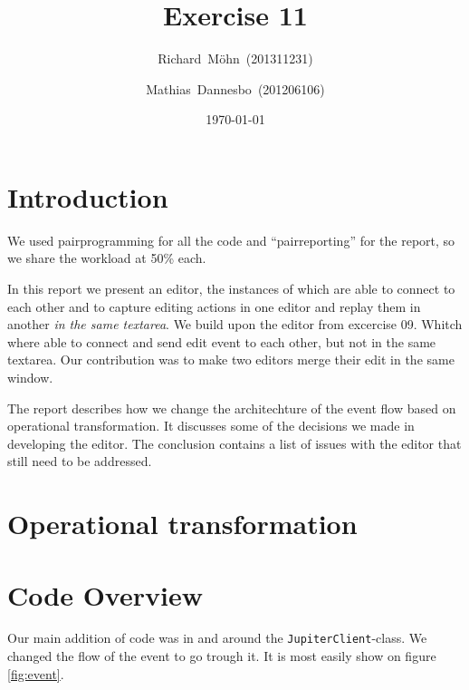 \documentclass[a4paper,draft,12pt,oneside,article,table]{memoir}
\newcommand{\supertitle}[1]{\gdef\suP{#1}}
\newcommand{\subtitle}[1]{\gdef\suB{#1}}
\newcommand{\stunum}[1]{\gdef\stuN{#1}}
\newcommand{\mil}[1]{\texttt{#1}}
\begin{document}
\supertitle{Distributed Systems}
\title{Exercise 11}
\author{Richard~Möhn~\small{(201311231)} \and Mathias~Dannesbo~\small{(201206106)}}
\date{\today}
\maketitle

\chapter{Introduction}
We used pairprogramming for all the code and ``pairreporting'' for the
report, so we share the workload at 50\% each.

In this report we present an editor, the instances of which are able
to connect to each other and to capture editing actions in one editor
and replay them in another \textit{in the same textarea}.  We build
upon the editor from excercise 09. Whitch where able to connect and
send edit event to each other, but not in the same textarea. Our contribution was to
make two editors merge their edit in the same window.

The report describes how we change the architechture of the event flow
based on operational transformation. It discusses some of the
decisions we made in developing the editor. The conclusion contains a
list of issues with the editor that still need to be addressed.

\chapter{Operational transformation}

\chapter{Code Overview}
Our main addition of code was in and around the \mil{JupiterClient}-class. We changed the flow of the event to go trough it. It is most easily show on figure \ref{fig:event}.
\end{document}
